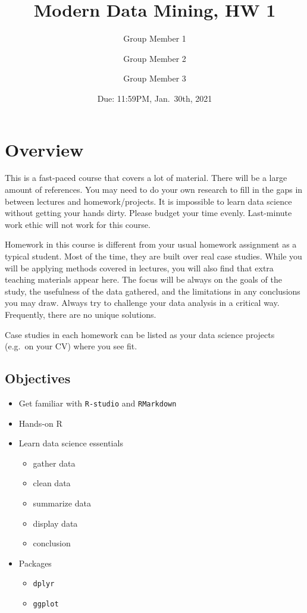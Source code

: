\documentclass[
]{article}
\title{Modern Data Mining, HW 1}
\author{Group Member 1 \and Group Member 2 \and Group Member 3}
\date{Due: 11:59PM, Jan.~30th, 2021}
\providecommand{\tightlist}{%
  \setlength{\itemsep}{0pt}\setlength{\parskip}{0pt}}
\begin{document}
\maketitle

{
\hypersetup{linkcolor=}
\setcounter{tocdepth}{4}
\tableofcontents
}
\pagebreak

\hypertarget{overview}{%
\section{Overview}\label{overview}}

This is a fast-paced course that covers a lot of material. There will be
a large amount of references. You may need to do your own research to
fill in the gaps in between lectures and homework/projects. It is
impossible to learn data science without getting your hands dirty.
Please budget your time evenly. Last-minute work ethic will not work for
this course.

Homework in this course is different from your usual homework assignment
as a typical student. Most of the time, they are built over real case
studies. While you will be applying methods covered in lectures, you
will also find that extra teaching materials appear here. The focus will
be always on the goals of the study, the usefulness of the data
gathered, and the limitations in any conclusions you may draw. Always
try to challenge your data analysis in a critical way. Frequently, there
are no unique solutions.

Case studies in each homework can be listed as your data science
projects (e.g.~on your CV) where you see fit.

\hypertarget{objectives}{%
\subsection{Objectives}\label{objectives}}

\begin{itemize}
\tightlist
\item
  Get familiar with \texttt{R-studio} and \texttt{RMarkdown}
\item
  Hands-on R
\item
  Learn data science essentials

  \begin{itemize}
  \tightlist
  \item
    gather data
  \item
    clean data
  \item
    summarize data
  \item
    display data
  \item
    conclusion
  \end{itemize}
\item
  Packages

  \begin{itemize}
  \tightlist
  \item
    \texttt{dplyr}
  \item
    \texttt{ggplot}
  \end{itemize}
\end{itemize}
\end{document}
